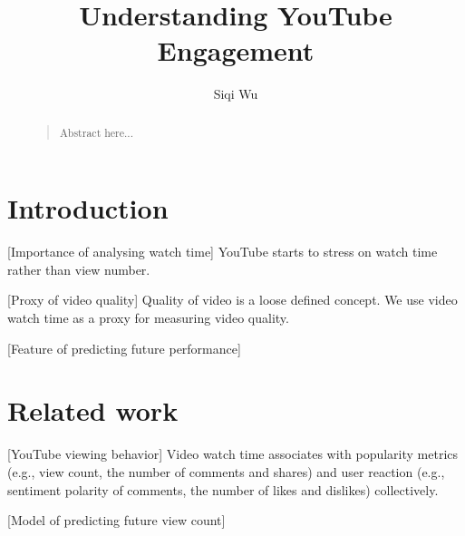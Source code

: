 \documentclass[letterpaper]{article}
\begin{document}

\title{Understanding YouTube Engagement}
\author{Siqi Wu\\
}

\maketitle

\begin{abstract}
\begin{quote}
Abstract here...
\end{quote}
\end{abstract}


\section{Introduction}
[Importance of analysing watch time] YouTube starts to stress on watch time rather than view number.

[Proxy of video quality] Quality of video is a loose defined concept. We use video watch time as a proxy for measuring video quality.

[Feature of predicting future performance]


\section{Related work}

[YouTube viewing behavior] Video watch time associates with popularity metrics (e.g., view count, the number of comments and shares) and user reaction (e.g., sentiment polarity of comments, the number of likes and dislikes) collectively. \cite{Park:2016data}

[Model of predicting future view count]

\end{document}
